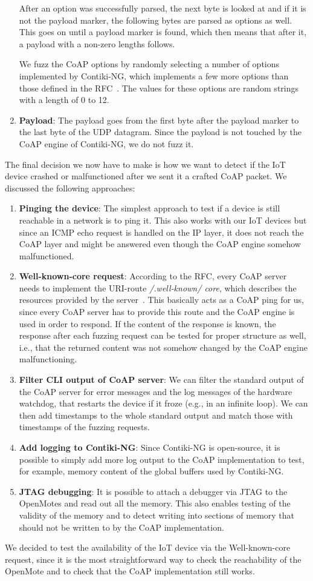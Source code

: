 \begin{enumerate}
	After an option was successfully parsed, the next byte is looked at and if it is not the payload marker, the following bytes are parsed as options as well. This goes on until a payload marker is found, which then means that after it, a payload with a non-zero lengths follows.

	We fuzz the CoAP options by randomly selecting a number of options implemented by Contiki-NG, which implements a few more options than those defined in the RFC~\cite{RFC7252}. The values for these options are random strings with a length of 0 to 12.
	\item \textbf{Payload}: The payload goes from the first byte after the payload marker to the last byte of the UDP datagram. Since the payload is not touched by the CoAP engine of Contiki-NG, we do not fuzz it.
\end{enumerate}

The final decision we now have to make is how we want to detect if the IoT device crashed or malfunctioned after we sent it a crafted CoAP packet. We discussed the following approaches:
\begin{enumerate}
	\item \textbf{Pinging the device}: The simplest approach to test if a device is still reachable in a network is to ping it. This also works with our IoT devices but since an ICMP echo request is handled on the IP layer, it does not reach the CoAP layer and might be answered even though the CoAP engine somehow malfunctioned.
	\item \textbf{Well-known-core request}: According to the RFC, every CoAP server needs to implement the URI-route \textit{/.well-known/ core}, which describes the resources provided by the server~\cite{RFC7252}. This basically acts as a CoAP ping for us, since every CoAP server has to provide this route and the CoAP engine is used in order to respond. If the content of the response is known, the response after each fuzzing request can be tested for proper structure as well, i.e., that the returned content was not somehow changed by the CoAP engine malfunctioning.
	\item \textbf{Filter CLI output of CoAP server}: We can filter the standard output of the CoAP server for error messages and the log messages of the hardware watchdog, that restarts the device if it froze (e.g., in an infinite loop). We can then add timestamps to the whole standard output and match those with timestamps of the fuzzing requests.
	\item \textbf{Add logging to Contiki-NG}: Since Contiki-NG is open-source, it is possible to simply add more log output to the CoAP implementation to test, for example, memory content of the global buffers used by Contiki-NG.
	\item \textbf{JTAG debugging}: It is possible to attach a debugger via JTAG to the OpenMotes and read out all the memory. This also enables testing of the validity of the memory and to detect writing into sections of memory that should not be written to by the CoAP implementation.
\end{enumerate}

We decided to test the availability of the IoT device via the Well-known-core request, since it is the most straightforward way to check the reachability of the OpenMote and to check that the CoAP implementation still works.
